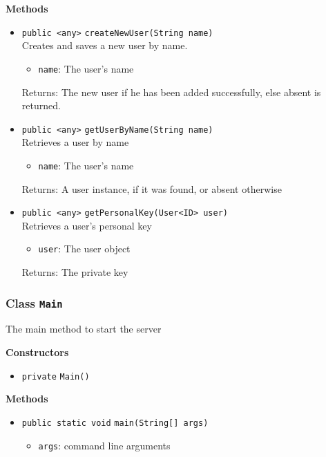 \textbf{Methods}
\begin{itemize}
\item \lstinline|public <any>| \lstinline|createNewUser|\lstinline|(String name)|\\
Creates and saves a new user by name.
\begin{itemize}
\item \lstinline|name|: The user's name
\end{itemize}

Returns: The new user if he has been added successfully, else absent is returned.

\item \lstinline|public <any>| \lstinline|getUserByName|\lstinline|(String name)|\\
Retrieves a user by name
\begin{itemize}
\item \lstinline|name|: The user's name
\end{itemize}

Returns: A user instance, if it was found, or absent otherwise

\item \lstinline|public <any>| \lstinline|getPersonalKey|\lstinline|(User<ID> user)|\\
Retrieves a user's personal key
\begin{itemize}
\item \lstinline|user|: The user object
\end{itemize}

Returns: The private key

\end{itemize}

\subsubsection{Class \lstinline|Main|}
The main method to start the server \\





\textbf{Constructors}
\begin{itemize}
\item \lstinline|private| \lstinline|Main|\lstinline|()|




\end{itemize}


\textbf{Methods}
\begin{itemize}
\item \lstinline|public static void| \lstinline|main|\lstinline|(String[] args)|

\begin{itemize}
\item \lstinline|args|: command line arguments
\end{itemize}



\end{itemize}


